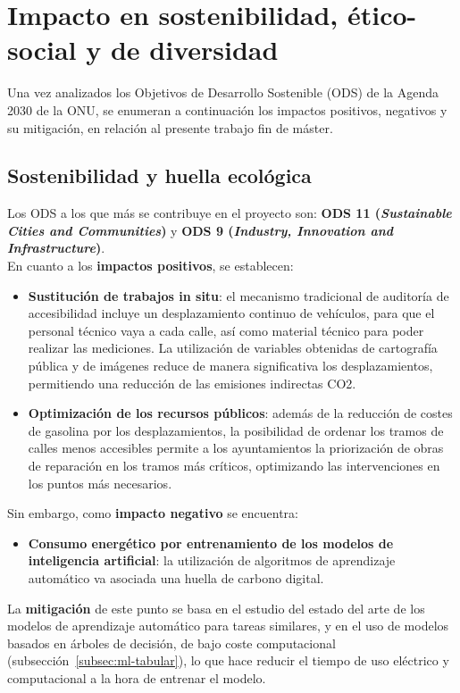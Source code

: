 \section{Impacto en sostenibilidad, ético-social y de diversidad}
\label{s:etic}

Una vez analizados los Objetivos de Desarrollo Sostenible (ODS) de la Agenda 2030 de la ONU, se enumeran a continuación los impactos positivos, negativos y su mitigación, en relación al presente trabajo fin de máster.

\subsection{Sostenibilidad y huella ecológica}

Los ODS a los que más se contribuye en el proyecto son: \textbf{ODS 11 (\textit{Sustainable Cities and Communities})} y \textbf{ODS 9 (\textit{Industry, Innovation and Infrastructure})}.
\\

En cuanto a los \textbf{impactos positivos}, se establecen:
\begin{itemize}
    \item \textbf{Sustitución de trabajos in situ}: el mecanismo tradicional de auditoría de accesibilidad incluye un desplazamiento continuo de vehículos, para que el personal técnico vaya a cada calle, así como material técnico para poder realizar las mediciones. La utilización de variables obtenidas de cartografía pública y de imágenes reduce de manera significativa los desplazamientos, permitiendo una reducción de las emisiones indirectas CO2.
    \item \textbf{Optimización de los recursos públicos}: además de la reducción de costes de gasolina por los desplazamientos, la posibilidad de ordenar los tramos de calles menos accesibles permite a los ayuntamientos la priorización de obras de reparación en los tramos más críticos, optimizando las intervenciones en los puntos más necesarios.
\end{itemize}

Sin embargo, como \textbf{impacto negativo} se encuentra:
\begin{itemize}
    \item \textbf{Consumo energético por entrenamiento de los modelos de inteligencia artificial}: la utilización de algoritmos de aprendizaje automático va asociada una huella de carbono digital.
\end{itemize}

La \textbf{mitigación} de este punto se basa en el estudio del estado del arte de los modelos de aprendizaje automático para tareas similares, y en el uso de modelos basados en árboles de decisión, de bajo coste computacional (subsección~\ref{subsec:ml-tabular}), lo que hace reducir el tiempo de uso eléctrico y computacional a la hora de entrenar el modelo.

